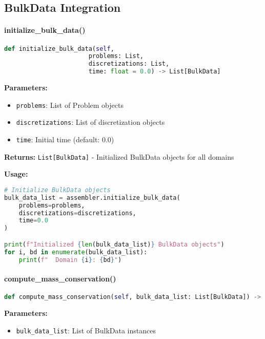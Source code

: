 \subsection{BulkData Integration}
\label{subsec_bulk_data_integration}

\paragraph{initialize\_bulk\_data()}\leavevmode
\begin{lstlisting}[language=Python, caption=Initialize BulkData Method]
def initialize_bulk_data(self, 
                       problems: List,
                       discretizations: List,
                       time: float = 0.0) -> List[BulkData]
\end{lstlisting}

\textbf{Parameters:}
\begin{itemize}
    \item \texttt{problems}: List of Problem objects
    \item \texttt{discretizations}: List of discretization objects
    \item \texttt{time}: Initial time (default: 0.0)
\end{itemize}

\textbf{Returns:} \texttt{List[BulkData]} - Initialized BulkData objects for all domains

\textbf{Usage:}
\begin{lstlisting}[language=Python, caption=BulkData Initialization Usage]
# Initialize BulkData objects
bulk_data_list = assembler.initialize_bulk_data(
    problems=problems,
    discretizations=discretizations,
    time=0.0
)

print(f"Initialized {len(bulk_data_list)} BulkData objects")
for i, bd in enumerate(bulk_data_list):
    print(f"  Domain {i}: {bd}")
\end{lstlisting}

\paragraph{compute\_mass\_conservation()}
\leavevmode
\begin{lstlisting}[language=Python, caption=Compute Mass Conservation Method]
def compute_mass_conservation(self, bulk_data_list: List[BulkData]) -> float
\end{lstlisting}

\textbf{Parameters:}
\begin{itemize}
    \item \texttt{bulk\_data\_list}: List of BulkData instances
\end{itemize}

